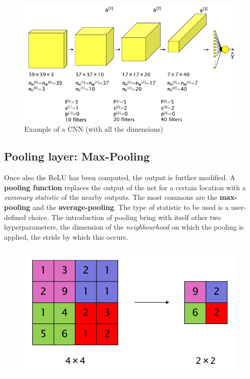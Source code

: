 \begin{figure}[h]
    \centering
    \includegraphics[scale=0.8]{img/ConvNet_Example.png}
    \caption{Example of a CNN (with all the dimensions)}
\end{figure}


\subsection{Pooling layer: Max-Pooling}
Once also the ReLU has been computed, the output is further modified. A \textbf{pooling function} replaces the output of the net for a certain location with a \textit{summary statistic} of the nearby outputs. The most commons are the \textbf{max-pooling} and the \textbf{average-pooling}. The type of statistic to be used is a user-defined choice. The introduction of pooling bring with itself other two hyperparameters, the dimension of the \textit{neighbourhood} on which the pooling is applied, the stride by which this occurs.

\begin{figure}[h] \label{fig: CNN_example}
    \centering
    \includegraphics[scale=0.7]{img/MaxPooling.png}
\end{figure}

